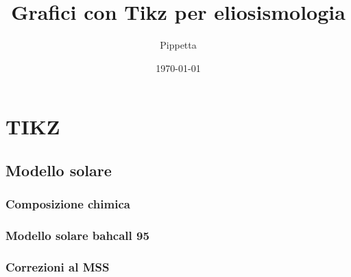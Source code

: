 \documentclass[oneside,12pt,fleqn]{memoir}
\author{Pippetta}
\title{Grafici con Tikz per eliosismologia}
\date{\today}
\begin{document}
\maketitle
\tableofcontents*

\part{TIKZ}


\chapter{Modello solare}

\section{Composizione chimica}



\section{Modello solare bahcall 95}

\clearpage

%


\section{Correzioni al MSS}

%


\end{document}
